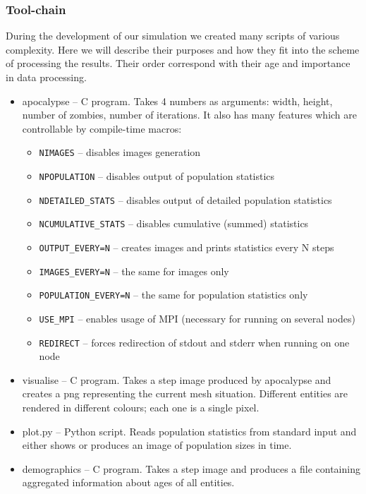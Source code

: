 \documentclass[a4paper]{article}
\begin{document}
\subsubsection{Tool-chain}

During the development of our simulation we created many scripts of various complexity.
Here we will describe their purposes and how they fit into the scheme of processing the results.
Their order correspond with their age and importance in data processing.

\begin{itemize}
\item apocalypse -- C program. Takes 4 numbers as arguments: width, height, number of zombies, number of iterations.
    It also has many features which are controllable by compile-time macros:
    \begin{itemize}
    \item \verb|NIMAGES| -- disables images generation
    \item \verb|NPOPULATION| -- disables output of population statistics
    \item \verb|NDETAILED_STATS| -- disables output of detailed population statistics
    \item \verb|NCUMULATIVE_STATS| -- disables cumulative (summed) statistics
    \item \verb|OUTPUT_EVERY=N| -- creates images and prints statistics every N steps
    \item \verb|IMAGES_EVERY=N| -- the same for images only
    \item \verb|POPULATION_EVERY=N| -- the same for population statistics only
    \item \verb|USE_MPI| -- enables usage of MPI (necessary for running on several nodes)
    \item \verb|REDIRECT| -- forces redirection of stdout and stderr when running on one node 
    \end{itemize}
\item visualise -- C program. Takes a step image produced by apocalypse and creates a png representing the current mesh situation.
    Different entities are rendered in different colours; each one is a single pixel.
\item plot.py -- Python script. Reads population statistics from standard input and either shows or produces an image of population sizes in time.
\item demographics -- C program. Takes a step image and produces a file containing aggregated information about ages of all entities.

\end{itemize}
\end{document}
